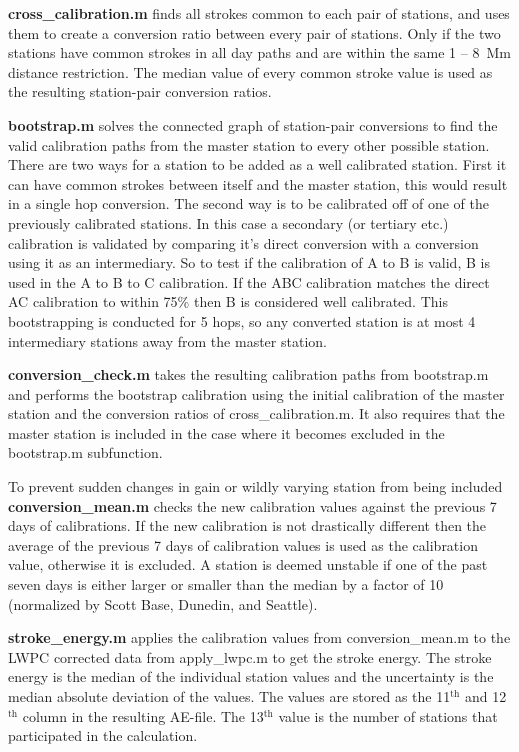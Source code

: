 {\bf cross\_calibration.m} finds all strokes common to each pair of stations, and uses them to create a conversion ratio between every pair of stations.
Only if the two stations have common strokes in all day paths and are within the same 1 -- 8~Mm distance restriction.
The median value of every common stroke value is used as the resulting station-pair conversion ratios.

{\bf bootstrap.m} solves the connected graph of station-pair conversions to find the valid calibration paths from the master station to every other possible station.
There are two ways for a station to be added as a well calibrated station.
First it can have common strokes between itself and the master station, this would result in a single hop conversion.
The second way is to be calibrated off of one of the previously calibrated stations.
In this case a secondary (or tertiary etc.) calibration is validated by comparing it's direct conversion with a conversion using it as an intermediary.
So to test if the calibration of A to B is valid, B is used in the A to B to C calibration.
If the ABC calibration matches the direct AC calibration to within 75\% then B is considered well calibrated.
This bootstrapping is conducted for 5 hops, so any converted station is at most 4 intermediary stations away from the master station.

{\bf conversion\_check.m} takes the resulting calibration paths from bootstrap.m and performs the bootstrap calibration using the initial calibration of the master station and the conversion ratios of cross\_calibration.m.
It also requires that the master station is included in the case where it becomes excluded in the bootstrap.m subfunction.

To prevent sudden changes in gain or wildly varying station from being included {\bf conversion\_mean.m} checks the new calibration values against the previous 7 days of calibrations.
If the new calibration is not drastically different then the average of the previous 7 days of calibration values is used as the calibration value, otherwise it is excluded.
A station is deemed unstable if one of the past seven days is either larger or smaller than the median by a factor of 10 (normalized by Scott Base, Dunedin, and Seattle).

{\bf stroke\_energy.m} applies the calibration values from conversion\_mean.m to the LWPC corrected data from apply\_lwpc.m to get the stroke energy.
The stroke energy is the median of the individual station values and the uncertainty is the median absolute deviation of the values.
The values are stored as the 11$^\text{th}$ and 12$^\text{th}$ column in the resulting AE-file.
The 13$^\text{th}$ value is the number of stations that participated in the calculation.

